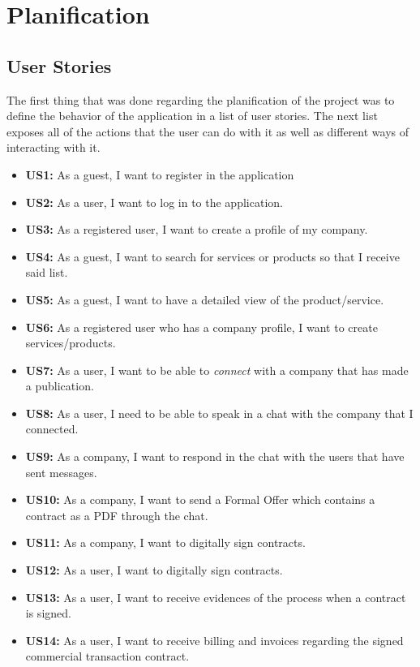 \documentclass[./main.tex]{subfiles}
\begin{document}
\section{Planification}

\subsection{User Stories}

The first thing that was done regarding the planification of the project
was to define the behavior of the application in a list of user stories.
The next list exposes all of the actions that the user can do with it as
well as different ways of interacting with it.

\begin{itemize}

\item
  \textbf{US1:} As a guest, I want to register in the application
\item
  \textbf{US2:} As a user, I want to log in to the application.
\item
  \textbf{US3:} As a registered user, I want to create a profile of my
  company.
\item
  \textbf{US4:} As a guest, I want to search for services or products so
  that I receive said list.
\item
  \textbf{US5:} As a guest, I want to have a detailed view of the
  product/service.
\item
  \textbf{US6:} As a registered user who has a company profile, I want
  to create services/products.
\item
  \textbf{US7:} As a user, I want to be able to \emph{connect} with a
  company that has made a publication.
\item
  \textbf{US8:} As a user, I need to be able to speak in a chat with the
  company that I connected.
\item
  \textbf{US9:} As a company, I want to respond in the chat with the
  users that have sent messages.
\item
  \textbf{US10:} As a company, I want to send a Formal Offer which
  contains a contract as a PDF through the chat.
\item
  \textbf{US11:} As a company, I want to digitally sign contracts.
\item
  \textbf{US12:} As a user, I want to digitally sign contracts.
\item
  \textbf{US13:} As a user, I want to receive evidences of the process
  when a contract is signed.
\item
  \textbf{US14:} As a user, I want to receive billing and invoices
  regarding the signed commercial transaction contract.
\end{itemize}
\end{document}
